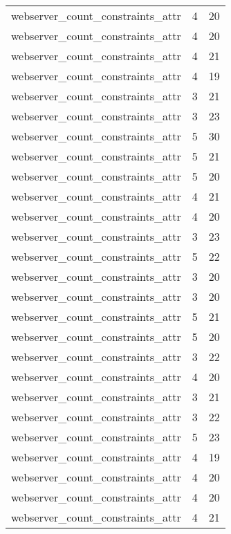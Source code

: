\begin{table}
\begin{tabular}{lrr}
webserver\_count\_constraints\_attr &         4 &        20 \\
webserver\_count\_constraints\_attr &         4 &        20 \\
webserver\_count\_constraints\_attr &         4 &        21 \\
webserver\_count\_constraints\_attr &         4 &        19 \\
webserver\_count\_constraints\_attr &         3 &        21 \\
webserver\_count\_constraints\_attr &         3 &        23 \\
webserver\_count\_constraints\_attr &         5 &        30 \\
webserver\_count\_constraints\_attr &         5 &        21 \\
webserver\_count\_constraints\_attr &         5 &        20 \\
webserver\_count\_constraints\_attr &         4 &        21 \\
webserver\_count\_constraints\_attr &         4 &        20 \\
webserver\_count\_constraints\_attr &         3 &        23 \\
webserver\_count\_constraints\_attr &         5 &        22 \\
webserver\_count\_constraints\_attr &         3 &        20 \\
webserver\_count\_constraints\_attr &         3 &        20 \\
webserver\_count\_constraints\_attr &         5 &        21 \\
webserver\_count\_constraints\_attr &         5 &        20 \\
webserver\_count\_constraints\_attr &         3 &        22 \\
webserver\_count\_constraints\_attr &         4 &        20 \\
webserver\_count\_constraints\_attr &         3 &        21 \\
webserver\_count\_constraints\_attr &         3 &        22 \\
webserver\_count\_constraints\_attr &         5 &        23 \\
webserver\_count\_constraints\_attr &         4 &        19 \\
webserver\_count\_constraints\_attr &         4 &        20 \\
webserver\_count\_constraints\_attr &         4 &        20 \\
webserver\_count\_constraints\_attr &         4 &        21 \\

\end{tabular}
\end{table}
